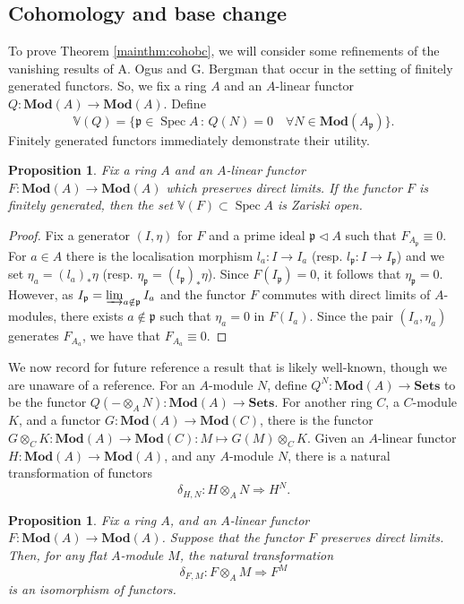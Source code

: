 \documentclass{amsart}
\theoremstyle{plain}
\newtheorem{prop}[thm]{Proposition}
\theoremstyle{definition}
\theoremstyle{remark}
\numberwithin{equation}{section}
\newcommand{\suchthat}{\,:\,}
\DeclareMathOperator{\spec}{Spec}
\newcommand{\MOD}[1]{\mathbf{Mod}({#1})}
\newcommand{\ideal}{\triangleleft}
\newcommand{\tensor}{\otimes}
\newcommand{\SETS}{\mathbf{Sets}}
\newcommand{\Van}{\mathbb{V}}
\begin{document}
\subsection{Cohomology and base change}
To prove Theorem \ref{mainthm:cohobc}, we will consider some
refinements of the vanishing results of A. Ogus and G. Bergman
\cite{MR0302633} that occur in the setting of finitely generated
functors. So, we fix a ring $A$ and an $A$-linear functor $Q : \MOD{A}
\to \MOD{A}$. Define
\[
 \Van(Q) = \{ \mathfrak{p}\in \spec A \suchthat 
 Q(N) = 0 \quad \forall N\in \MOD{A_{\mathfrak{p}}} \}.    
 \]
Finitely generated functors immediately demonstrate their utility. 
\begin{prop}\label{prop:nakayama}
  Fix a ring $A$ and an $A$-linear functor $F : \MOD{A} \to
  \MOD{A}$ which preserves direct limits. If the functor $F$ is
  finitely generated, then the set $\Van(F) \subset \spec A$ is Zariski open.
\end{prop}
\begin{proof}
  Fix a generator $(I,\eta)$ for $F$ and a prime ideal $\mathfrak{p}
  \ideal A$ such that $F_{A_{\mathfrak{p}}} \equiv 0$. For $a\in A$
  there is the localisation morphism $l_a : I \to I_a$
  (resp. $l_{\mathfrak{p}} : I \to I_\mathfrak{p}$) and we set $\eta_a =
  (l_a)_*\eta$ (resp. $\eta_{\mathfrak{p}} =
  (l_\mathfrak{p})_*\eta$). Since $F(I_{\mathfrak{p}}) = 0$, it
  follows that
  $\eta_{\mathfrak{p}} = 0$. However, as $I_{\mathfrak{p}} =
  \varinjlim_{a\notin \mathfrak{p}} I_a$ and the functor $F$ commutes
  with direct limits of $A$-modules, there exists $a\notin
  \mathfrak{p}$ such that $\eta_a = 0$ in $F(I_a)$. Since the pair
  $(I_a,\eta_a)$ generates $F_{A_a}$, we have that $F_{A_a} \equiv 0$.
\end{proof}
We now record for future reference a result that is likely well-known,
though we are unaware of a reference. For an $A$-module $N$, define
$Q^N : \MOD{A} \to \SETS$ to be the 
functor $Q(-\tensor_A N) : \MOD{A} \to \SETS$.      
For another ring $C$, a $C$-module $K$, and a functor $G :
\MOD{A} \to \MOD{C}$, there is the functor $G\tensor_C K :
\MOD{A} \to \MOD{C} : M \mapsto G(M)\tensor_C K$. Given an
$A$-linear functor $H : \MOD{A} \to \MOD{A}$, and any $A$-module $N$,
there is a natural transformation of functors 
\[
\delta_{H,N} : H\tensor_A N \Rightarrow H^N.
\]
\begin{prop}\label{prop:lazardlem}
  Fix a ring $A$, and an $A$-linear functor $F : \MOD{A} \to
  \MOD{A}$. Suppose that the functor $F$ preserves direct
  limits. Then, for any flat $A$-module $M$, the natural 
  transformation
  \[
  \delta_{F,M} : F\tensor_A M \Rightarrow F^M
  \]
  is an isomorphism of functors. 
\end{prop}
\end{document}
